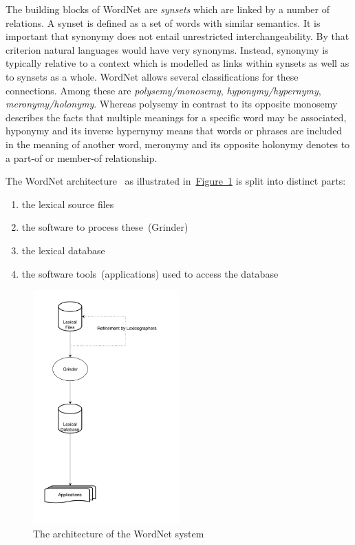 \documentclass[draft,final]{vutinfth} %
\begin{document}
The building blocks of WordNet are \textit{synsets} which are linked by a number of relations. A synset is defined as a set of words with similar semantics. It is important that synonymy does not entail unrestricted interchangeability. By that criterion natural languages would have very synonyms. Instead, synonymy is typically relative to a context which is modelled as links within synsets as well as to synsets as a whole. WordNet allows several classifications for these connections. Among these are \textit{polysemy/monosemy}, \textit{hyponymy/hypernymy}, \textit{meronymy/holonymy}. Whereas polysemy in contrast to its opposite monosemy describes the facts that multiple meanings for a specific word may be associated, hyponymy and its inverse hypernymy means that words or phrases are included in the meaning of another word, meronymy and its opposite holonymy denotes to a part-of or member-of relationship.

The WordNet architecture~\cite{fellbaum1998} as illustrated in~\hyperref[fig:wordnet_architecture]{Figure~\ref*{fig:wordnet_architecture}} is split into distinct parts:
\begin{enumerate}
		\item the lexical source files
		\item the software to process these~(Grinder)
		\item the lexical database
		\item the software tools~(applications) used to access the database
\end{enumerate}

\begin{figure}
	 \centering
	 \includegraphics[width=0.5\textwidth]{drawio/WordNet_Architecture}
	 \caption{The architecture of the WordNet system~\cite{fellbaum1998}}\label{fig:wordnet_architecture}
\end{figure}
\end{document}
